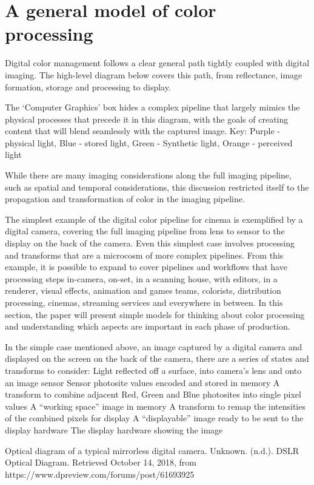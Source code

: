 \section{A general model of color processing}

Digital color management follows a clear general path tightly coupled with digital imaging. The high-level diagram below covers this path, from reflectance, image formation, storage and processing to display.

The ‘Computer Graphics’ box hides a complex pipeline that largely mimics the physical processes that precede it in this diagram, with the goals of creating content that will blend seamlessly with the captured image. Key: Purple - physical light, Blue - stored light, Green - Synthetic light, Orange - perceived light

While there are many imaging considerations along the full imaging pipeline, such as spatial and temporal considerations, this discussion restricted itself to the propagation and transformation of color in the imaging pipeline.

The simplest example of the digital color pipeline for cinema is exemplified by a digital camera, covering the full imaging pipeline from lens to sensor to the display on the back of the camera. Even this simplest case involves processing and transforms that are a microcosm of more complex pipelines. From this example, it is possible to expand to cover pipelines and workflows that have processing steps in-camera, on-set, in a scanning house, with editors, in a renderer, visual effects, animation and games teams, colorists, distribution processing, cinemas, streaming services and everywhere in between. In this section, the paper will present simple models for thinking about color processing and understanding which aspects are important in each phase of production.

In the simple case mentioned above, an image captured by a digital camera and displayed on the screen on the back of the camera, there are a series of states and transforms to consider:
Light reflected off a surface, into camera’s lens and onto an image sensor
Sensor photosite values encoded and stored in memory
A transform to combine adjacent Red, Green and Blue photosites into single pixel values
A “working space” image in memory
A transform to remap the intensities of the combined pixels for display
A “displayable” image ready to be sent to the display hardware
The display hardware showing the image


Optical diagram of a typical mirrorless digital camera.
Unknown. (n.d.). DSLR Optical Diagram. Retrieved October 14, 2018, from https://www.dpreview.com/forums/post/61693925

